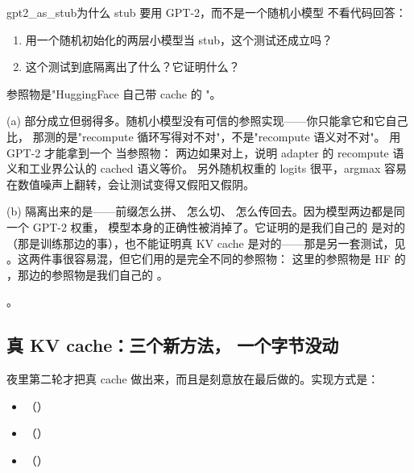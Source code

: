 \begin{checkpoint}{gpt2_as_stub}{为什么 stub 要用 GPT-2，而不是一个随机小模型}
不看代码回答：
\begin{enumerate}[label=(\alph*)]
  \item 用一个随机初始化的两层小模型当 stub，这个测试还成立吗？
  \item 这个测试到底隔离出了什么？它证明什么？
\end{enumerate}
\hint 参照物是"HuggingFace 自己带 cache 的 "。

\ifshowanswers
\tcblower
\answer (a) 部分成立但弱得多。随机小模型没有可信的参照实现——你只能拿它和它自己比，
那测的是"recompute 循环写得对不对"，不是"recompute 语义对不对"。
用 GPT-2 才能拿到一个  当参照物：
两边如果对上，说明 adapter 的 recompute 语义和工业界公认的 cached 语义等价。
另外随机权重的 logits 很平，argmax 容易在数值噪声上翻转，会让测试变得又假阳又假阴。

(b) 隔离出来的是——前缀怎么拼、\code{[:, -1, :]} 怎么切、
 怎么传回去。因为模型两边都是同一个 GPT-2 权重，
模型本身的正确性被消掉了。它证明的是我们自己的  是对的
（那是训练那边的事），也不能证明真 KV cache 是对的——那是另一套测试，见
。这两件事很容易混，但它们用的是完全不同的参照物：
这里的参照物是 HF 的 ，那边的参照物是我们自己的 。

\whereincode {}。
\fi
\end{checkpoint}

\subsection{真 KV cache：三个新方法， 一个字节没动}
\label{sec:b-kv-impl}

夜里第二轮才把真 cache 做出来，而且是刻意放在最后做的。实现方式是：

\begin{itemize}[leftmargin=1.5em]
  \item {}（）
  \item {}（）
  \item {}（）
\end{itemize}

